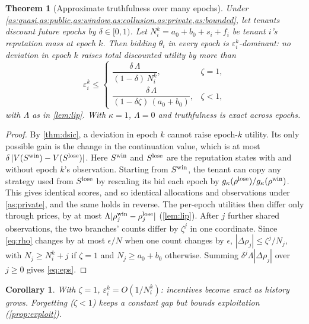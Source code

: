 \documentclass[journal]{IEEEtran}
\newtheorem{theorem}{Theorem}
\newtheorem{corollary}{Corollary}
\theoremstyle{remark}
\begin{document}
\begin{theorem}[Approximate truthfulness over many epochs]\label{thm:multi}
Under \cref{as:quasi,as:public,as:window,as:collusion,as:private,as:bounded}, let tenants discount future epochs by $\delta\in[0,1)$. Let $N_i^k=a_0+b_0+s_i+f_i$ be tenant $i$'s reputation mass at epoch $k$. Then bidding $\theta_i$ in every epoch is $\varepsilon_i^k$-dominant: no deviation in epoch $k$ raises total discounted utility by more than
\begin{equation}\label{eq:eps}
\varepsilon_i^k\le
\begin{cases}
\dfrac{\delta\,\Lambda}{(1-\delta)\,N_i^k}, & \zeta=1,\\[2.2ex]
\dfrac{\delta\,\Lambda}{(1-\delta\zeta)\,(a_0+b_0)}, & \zeta<1,
\end{cases}
\end{equation}
with $\Lambda$ as in \cref{lem:lip}. With $\kappa=1$, $\Lambda=0$ and truthfulness is exact across epochs.
\end{theorem}
\begin{proof}
By \cref{thm:dsic}, a deviation in epoch $k$ cannot raise epoch-$k$ utility. Its only possible gain is the change in the continuation value, which is at most $\delta\,|V(S^{\rm win})-V(S^{\rm lose})|$. Here $S^{\rm win}$ and $S^{\rm lose}$ are the reputation states with and without epoch $k$'s observation. Starting from $S^{\rm win}$, the tenant can copy any strategy used from $S^{\rm lose}$ by rescaling its bid each epoch by $g_\kappa(\rho^{\rm lose})/g_\kappa(\rho^{\rm win})$. This gives identical scores, and so identical allocations and observations under \cref{as:private}, and the same holds in reverse. The per-epoch utilities then differ only through prices, by at most $\Lambda|\rho^{\rm win}_j-\rho^{\rm lose}_j|$ (\cref{lem:lip}). After $j$ further shared observations, the two branches' counts differ by $\zeta^j$ in one coordinate. Since \eqref{eq:rho} changes by at most $\epsilon/N$ when one count changes by $\epsilon$, $|\Delta\rho_j|\le\zeta^j/N_j$, with $N_j\ge N_i^k+j$ if $\zeta=1$ and $N_j\ge a_0+b_0$ otherwise. Summing $\delta^{j}\Lambda|\Delta\rho_j|$ over $j\ge0$ gives \eqref{eq:eps}.
\end{proof}

\begin{corollary}\label{cor:asym}
With $\zeta=1$, $\varepsilon_i^k=O(1/N_i^k)$: incentives become exact as history grows. Forgetting ($\zeta<1$) keeps a constant gap but bounds exploitation (\cref{prop:exploit}).
\end{corollary}
\end{document}
